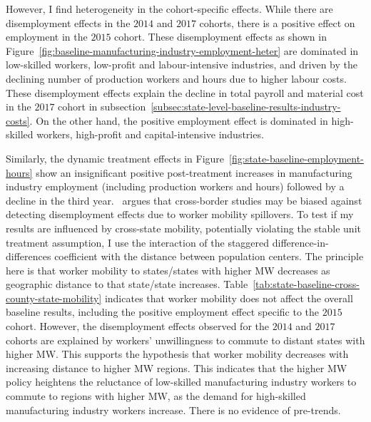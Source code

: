 \documentclass[authoryear, preprint, twocolumn, 1p]{elsarticle}
\begin{document}
    However, I find heterogeneity in the cohort-specific effects. While there are disemployment effects in the $2014$ and $2017$ cohorts, there is a positive effect on employment in the $2015$ cohort. These disemployment effects as shown in Figure~\ref{fig:baseline-manufacturing-industry-employment-heter} are dominated in low-skilled workers, low-profit and labour-intensive industries, and driven by the declining number of production workers and hours due to higher labour costs. These disemployment effects explain the decline in total payroll and material cost in the $2017$ cohort in subsection~\ref{subsec:state-level-baseline-results-industry-costs}. On the other hand, the positive employment effect is dominated in high-skilled workers, high-profit and capital-intensive industries.

    Similarly, the dynamic treatment effects in Figure~\ref{fig:state-baseline-employment-hours} show an insignificant positive post-treatment increases in manufacturing industry employment (including production workers and hours) followed by a decline in the third year.~\citet{neumark2019econometrics} argues that cross-border studies may be biased against detecting disemployment effects due to worker mobility spillovers. To test if my results are influenced by cross-state mobility, potentially violating the stable unit treatment assumption, I use the interaction of the staggered difference-in-differences coefficient with the distance between population centers. The principle here is that worker mobility to states/states with higher MW decreases as geographic distance to that state/state increases. Table~\ref{tab:state-baseline-cross-county-state-mobility} indicates that worker mobility does not affect the overall baseline results, including the positive employment effect specific to the $2015$ cohort. However, the disemployment effects observed for the $2014$ and $2017$ cohorts are explained by workers' unwillingness to commute to distant states with higher MW. This supports the hypothesis that worker mobility decreases with increasing distance to higher MW regions. This indicates that the higher MW policy heightens the reluctance of low-skilled manufacturing industry workers to commute to regions with higher MW, as the demand for high-skilled manufacturing industry workers increase. There is no evidence of pre-trends.
    
    
\end{document}
